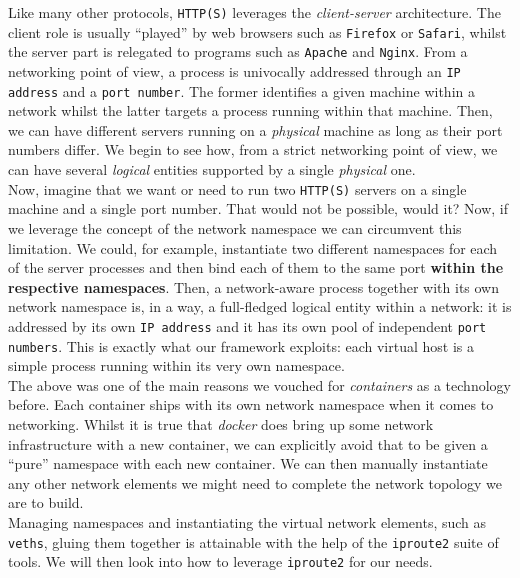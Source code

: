             Like many other protocols, \texttt{HTTP(S)} leverages the \textit{client-server} architecture. The client role is usually ``played'' by web browsers such as \texttt{Firefox} or \texttt{Safari}, whilst the server part is relegated to programs such as \texttt{Apache} and \texttt{Nginx}. From a networking point of view, a process is univocally addressed through an \texttt{IP address} and a \texttt{port number}. The former identifies a given machine within a network whilst the latter targets a process running within that machine. Then, we can have different servers running on a \textit{physical} machine as long as their port numbers differ. We begin to see how, from a strict networking point of view, we can have several \textit{logical} entities supported by a single \textit{physical} one.\\

            Now, imagine that we want or need to run two \texttt{HTTP(S)} servers on a single machine and a single port number. That would not be possible, would it? Now, if we leverage the concept of the network namespace we can circumvent this limitation. We could, for example, instantiate two different namespaces for each of the server processes and then bind each of them to the same port \textbf{within the respective namespaces}. Then, a network-aware process together with its own network namespace is, in a way, a full-fledged logical entity within a network: it is addressed by its own \texttt{IP address} and it has its own pool of independent \texttt{port numbers}. This is exactly what our framework exploits: each virtual host is a simple process running within its very own namespace.\\

        The above was one of the main reasons we vouched for \textit{containers} as a technology before. Each container ships with its own network namespace when it comes to networking. Whilst it is true that \textit{docker} does bring up some network infrastructure with a new container, we can explicitly avoid that to be given a ``pure'' namespace with each new container. We can then manually instantiate any other network elements we might need to complete the network topology we are to build.\\

        Managing namespaces and instantiating the virtual network elements, such as \texttt{veths}, gluing them together is attainable with the help of the \texttt{iproute2} suite of tools. We will then look into how to leverage \texttt{iproute2} for our needs.\\

